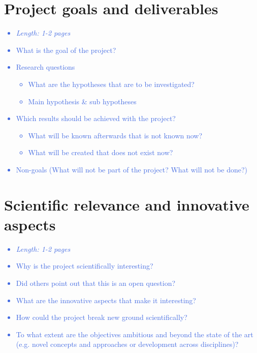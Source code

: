 \documentclass[a4paper,11pt]{article}
\providecommand*{\note}[1]{\small \textcolor{RoyalBlue}{\begin{minipage}{\textwidth}{#1}\end{minipage}}}
\begin{document}
\section{Project goals and deliverables}
\label{sect:goals}

\note{
\begin{itemize}
	\item {\em Length: 1-2 pages}
	\item What is the goal of the project?
	\item Research questions
	\begin{itemize}
		\item 	    What are the hypotheses that are to be investigated?
		\item 	    Main hypothesis \& sub hypotheses
	\end{itemize}
	\item Which results should be achieved with the project?
	\begin{itemize}
	    	\item 	   What will be known afterwards that is not known now?
		\item	    What will be created that does not exist now?
	\end{itemize}
	\item Non-goals (What will not be part of the project? What will not be done?)
\end{itemize}
}

\section{Scientific relevance and innovative aspects}
\label{sect:relevance}

\note{
\begin{itemize}
\item {\em Length: 1-2 pages}
\item Why is the project scientifically interesting?
\item Did others point out that this is an open question?
\item What are the innovative aspects that make it interesting?
\item How could the project break new ground scientifically?
\item To what extent are the objectives ambitious and beyond the state of the art (e.g. novel concepts and approaches or development across disciplines)?
\end{itemize}
}
\end{document}
